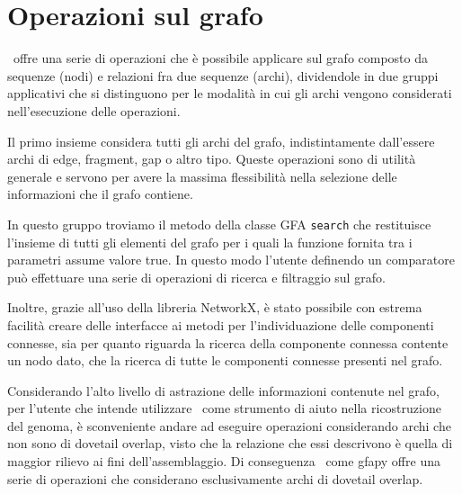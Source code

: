\section{Operazioni sul grafo}
\pygfa \  offre una serie di operazioni che è possibile applicare sul grafo
composto da sequenze (nodi) e relazioni fra due sequenze (archi),
dividendole in due gruppi applicativi che si distinguono per le modalità
in cui gli archi vengono considerati nell'esecuzione delle operazioni.

Il primo insieme considera tutti gli archi del grafo, indistintamente dall'essere
archi di edge, fragment, gap o altro tipo. Queste operazioni sono
di utilità generale e servono per avere la massima flessibilità nella selezione delle
informazioni che il grafo contiene.

In questo gruppo troviamo il metodo della classe GFA \texttt{search} che
restituisce l'insieme di tutti gli elementi del grafo per i quali la funzione fornita
tra i parametri assume valore true. In questo modo l'utente definendo un
comparatore  può effettuare una serie di operazioni di ricerca e filtraggio sul grafo.

Inoltre, grazie all'uso della libreria NetworkX, è stato possibile con estrema facilità
creare delle interfacce ai metodi per l'individuazione delle componenti connesse, sia
per quanto riguarda la ricerca della componente connessa contente un nodo dato, che
la ricerca di tutte le componenti connesse presenti nel grafo.

Considerando l'alto livello di astrazione delle informazioni contenute
nel grafo, per l'utente che intende utilizzare \pygfa  \  come strumento di
aiuto nella ricostruzione del genoma, è sconveniente andare ad eseguire
operazioni considerando archi che non sono di dovetail overlap, visto
che la relazione che essi descrivono è quella di maggior rilievo ai fini
dell'assemblaggio. Di conseguenza \pygfa \  come gfapy offre una serie
di operazioni che considerano esclusivamente archi di dovetail overlap.

